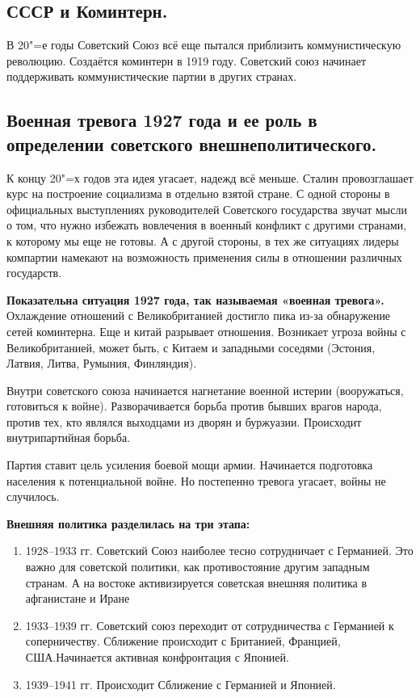\subsection{СССР и Коминтерн.}

В 20"=е годы Советский Союз всё еще пытался приблизить коммунистическую революцию. Создаётся коминтерн в 1919 году. Советский союз начинает поддерживать коммунистические партии в других странах. 

\subsection{Военная тревога 1927 года и ее роль в определении советского внешнеполитического.}

К концу 20"=х годов эта идея угасает, надежд всё меньше. Сталин провозглашает курс на построение социализма в отдельно взятой стране. С одной стороны в официальных выступлениях руководителей Советского государства звучат мысли о том, что нужно избежать вовлечения в военный конфликт с другими странами, к которому мы еще не готовы. А с другой стороны, в тех же ситуациях лидеры компартии намекают на возможность применения силы в отношении различных государств.

\textbf{Показательна ситуация 1927 года, так называемая «военная тревога».} Охлаждение отношений с Великобританией достигло пика из-за обнаружение сетей коминтерна. Еще и китай разрывает отношения. Возникает угроза войны с Великобританией, может быть, с Китаем и западными соседями (Эстония, Латвия, Литва, Румыния, Финляндия). 

Внутри советского союза начинается нагнетание военной истерии (вооружаться, готовиться к войне). Разворачивается борьба против бывших врагов народа, против тех, кто являлся выходцами из дворян и буржуазии. Происходит внутрипартийная борьба.

Партия ставит цель усиления боевой мощи армии. Начинается подготовка населения к потенциальной войне. Но постепенно тревога угасает, войны не случилось. 

\textbf{Внешняя политика разделилась на три этапа:}

\begin{enumerate}
    \item 1928--1933 гг. Советский Союз наиболее тесно сотрудничает с Германией. Это важно для советской политики, как противостояние другим западным странам. А на востоке активизируется советская внешняя политика в афганистане и Иране
    \item 1933--1939 гг. Советский союз переходит от сотрудничества с Германией	 к соперничеству. Сближение происходит с Британией, Францией, США.Начинается активная конфронтация с Японией.
    \item 1939--1941 гг. Происходит Сближение с Германией и Японией.
\end{enumerate}

